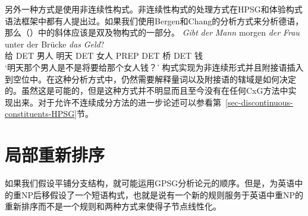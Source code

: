 另外一种方式是使用非连续性构式。非连续性构式的处理方式在HPSG\citep{Reape94a}和体验构式语法\citep{BC2005a}框架中都有人提出过。如果我们使用Bergen和Chang的分析方式来分析德语，那么（）中的斜体应该是双及物构式的一部分。
\ea
\gll \emph{Gibt} \emph{der} \emph{Mann} morgen \emph{der} \emph{Frau} unter der Brücke \emph{das} \emph{Geld}?\\
	 给 DET 男人 明天 DET 女人 PREP DET 桥 DET 钱\\
\glt `明天那个男人是不是将要给那个女人钱？'
\z
构式实现为非连续形式并且附接语插入到空位中。在这种分析方式中，仍然需要解释量词以及附接语的辖域是如何决定的。虽然这是可能的，但是这种方式并不明显而且至今没有在任何CxG方法中实现出来。对于允许不连续成分方法的进一步论述可以参看第~\ref{sec-discontinuous-constituents-HPSG}节。

\section{局部重新排序}

\addlines
如果我们假设平铺分支结构，就可能运用GPSG分析\indexgpsgc 论元的顺序。但是，\citet{Kay2002a}为英语中的重NP后移假设了一个短语构式，也就是说有一个新的规则服务于英语中重NP的重新排序而不是一个规则和两种方式来使得子节点线性化。

